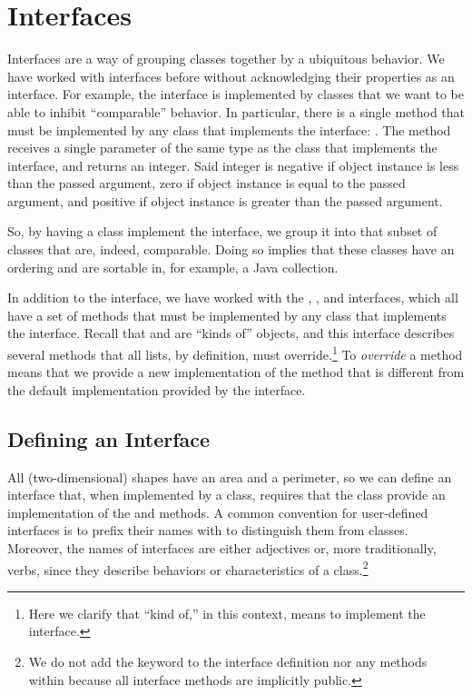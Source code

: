 \section{Interfaces}
\label{chapter-classes-interfaces}

Interfaces are a way of grouping classes together by a ubiquitous behavior. 
We have worked with interfaces before without acknowledging their properties as an interface.
For example, the  interface is implemented by classes that we want to be able to inhibit ``comparable'' behavior. 
In particular, there is a single method that must be implemented by any class that implements the  interface: . 
The  method receives a single parameter of the same type as the class that implements the  interface, and returns an integer. 
Said integer is negative if  object instance is less than the passed argument, zero if  object instance is equal to the passed argument, and positive if  object instance is greater than the passed argument.

So, by having a class implement the  interface, we group it into that subset of classes that are, indeed, comparable. 
Doing so implies that these classes have an ordering and are sortable in, for example, a Java collection. 

In addition to the  interface, we have worked with the , , and  interfaces, which all have a set of methods that must be implemented by any class that implements the interface. 
Recall that  and  are ``kinds of''  objects, and this interface describes several methods that all lists, by definition, must override.\footnote{Here we clarify that ``kind of,'' in this context, means to implement the  interface.} 
To \emph{override} a method means that we provide a new implementation of the method that is different from the default implementation provided by the interface.

\subsection*{Defining an Interface}

All (two-dimensional) shapes have an area and a perimeter, so we can define an interface that, when implemented by a class, requires that the class provide an implementation of the  and  methods. 
A common convention for user-defined interfaces is to prefix their names with  to distinguish them from classes. 
Moreover, the names of interfaces are either adjectives or, more traditionally, verbs, since they describe behaviors or characteristics of a class.\footnote{We do not add the  keyword to the interface definition nor any methods within because all interface methods are implicitly public.}


